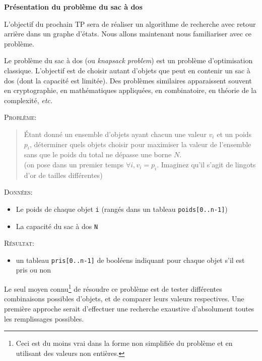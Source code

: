 \documentclass[10pt]{article}\usepackage[correction,nu]{esial}%
\begin{document}
\Exercice\textbf{Présentation du problème du sac à dos}

L'objectif du prochain TP sera de réaliser un algorithme de recherche avec
retour arrière dans un graphe d'états. Nous allons maintenant nous familiariser
avec ce problème.

Le problème du sac à dos (ou \textit{knapsack problem}) est un problème
d'optimisation classique. L'objectif est de choisir autant d'objets que peut en
contenir un sac à dos (dont la capacité est limitée). Des problèmes similaires
apparaissent souvent en cryptographie, en mathématiques appliquées, en
combinatoire, en théorie de la complexité, \textit{etc.}
\medskip

\noindent\textsc{Problème:} \vspace{-.2\baselineskip}
\begin{quote}
  Étant donné un ensemble d'objets ayant chacun une valeur $v_i$ et un poids
  $p_i$, déterminer quels objets choisir pour maximiser la
  valeur de l'ensemble sans que le poids du total ne dépasse une borne $N$.\\
  (on pose dans un premier temps $\forall i, v_i=p_i$. Imaginez qu'il s'agit de
  lingots d'or de tailles différentes)
\end{quote}


\textsc{Données}:
\begin{itemize}
\item Le poids de chaque objet \texttt{i} (rangés dans un tableau
  \texttt{poids[0..n-1]})
\item La capacité du sac à dos \texttt{N}
\end{itemize}

\textsc{Résultat}:
\begin{itemize}
\item un tableau \texttt{pris[0..n-1]} de booléens indiquant pour chaque objet
  s'il est pris ou non
\end{itemize}

\medskip Le seul moyen connu\footnote{Ceci est du moins vrai dans la forme non
  simplifiée du problème et en utilisant des valeurs non entières.
  } de résoudre ce problème est de tester différentes combinaisons
possibles d'objets, et de comparer leurs valeurs respectives.  Une première
approche serait d'effectuer une recherche exaustive d'absolument toutes les
remplissages possibles.
\end{document}
